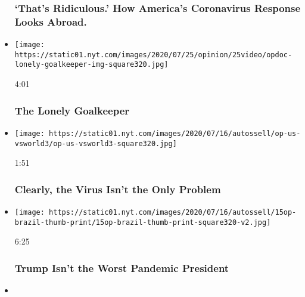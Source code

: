 \begin{itemize}
{  \subsubsection{`That's Ridiculous.' How America's Coronavirus Response
  Looks
  Abroad.}\label{thats-ridiculous-how-americas-coronavirus-response-looks-abroad}}
\item
  \href{https://www.nytimes.com/video/opinion/100000007229285/the-lonely-goalkeeper.html?action=click\&module=video-series-bar\&region=header\&pgtype=Article\&playlistId=video/opinion}{}

  \texttt{[image: https://static01.nyt.com/images/2020/07/25/opinion/25video/opdoc-lonely-goalkeeper-img-square320.jpg]}

  4:01

  \hypertarget{the-lonely-goalkeeper}{%
  \subsubsection{The Lonely Goalkeeper}\label{the-lonely-goalkeeper}}
\item
  \href{https://www.nytimes.com/video/opinion/100000007242791/coronavirus-response-america.html?action=click\&module=video-series-bar\&region=header\&pgtype=Article\&playlistId=video/opinion}{}

  \texttt{[image: https://static01.nyt.com/images/2020/07/16/autossell/op-us-vsworld3/op-us-vsworld3-square320.jpg]}

  1:51

  \hypertarget{clearly-the-virus-isnt-the-only-problem}{%
  \subsubsection{Clearly, the Virus Isn't the Only
  Problem}\label{clearly-the-virus-isnt-the-only-problem}}
\item
  \href{https://www.nytimes.com/video/opinion/100000007227771/coronavirus-covid-brazil-bolsonaro.html?action=click\&module=video-series-bar\&region=header\&pgtype=Article\&playlistId=video/opinion}{}

  \texttt{[image: https://static01.nyt.com/images/2020/07/16/autossell/15op-brazil-thumb-print/15op-brazil-thumb-print-square320-v2.jpg]}

  6:25

  \hypertarget{trump-isnt-the-worst-pandemic-president}{%
  \subsubsection{Trump Isn't the Worst Pandemic
  President}\label{trump-isnt-the-worst-pandemic-president}}
\item
  \href{https://www.nytimes.com/video/opinion/100000007227752/hollywood-latinos-diversity.html?action=click\&module=video-series-bar\&region=header\&pgtype=Article\&playlistId=video/opinion}{}


\end{itemize}
